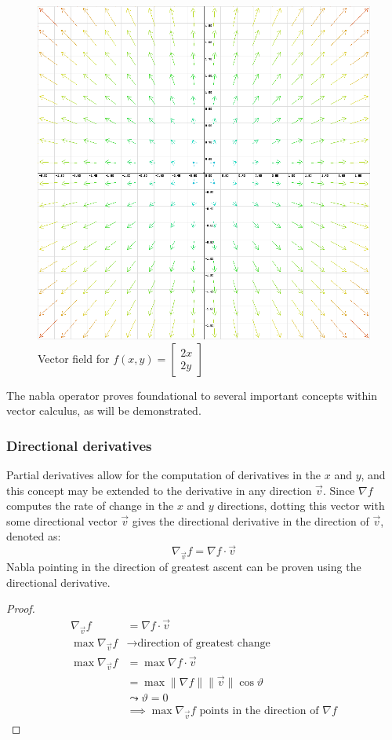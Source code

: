 \documentclass[a4paper,12pt]{article}
\renewcommand{\theta}{\vartheta}      		%
\begin{document}
\begin{figure}[!ht]
	\includegraphics[scale=0.45]{x2y2.png}
	\centering
	\caption{Vector field for $f(x,y)=\begin{bmatrix}2x\\2y\end{bmatrix}$}
	\label{fig:x2y2}
\end{figure}

The nabla operator proves foundational to several important concepts within vector calculus, as will be demonstrated.

\subsubsection*{Directional derivatives}
Partial derivatives allow for the computation of derivatives in the $x$ and $y$, and this concept may be extended to the derivative in any direction $\vec{v}$. Since $\nabla f$ computes the rate of change in the $x$ and $y$ directions, dotting this vector with some directional vector $\vec{v}$ gives the directional derivative in the direction of $\vec{v}$, denoted as:
\begin{equation}
	\nabla_{\vec{v}}f=\nabla f\cdot\vec{v}
\end{equation}
Nabla pointing in the direction of greatest ascent can be proven using the directional derivative.
\begin{proof}\label{p:nablagreatestchange}
	\begin{align*}
		\nabla_{\vec{v}}f&=\nabla f\cdot\vec{v}\\
		\max\nabla_{\vec{v}}f&\rightarrow\text{direction of greatest change}\\
		\max\nabla_{\vec{v}}f&=\max\nabla f\cdot\vec{v}\\
		&=\max\lVert\nabla f\rVert\lVert\vec{v}\rVert\cos{\theta}\\
		&\leadsto\theta=0\\
		&\implies\max\nabla_{\vec{v}}f\text{ points in the direction of }\nabla f
	\end{align*}
\end{proof}
\end{document}

